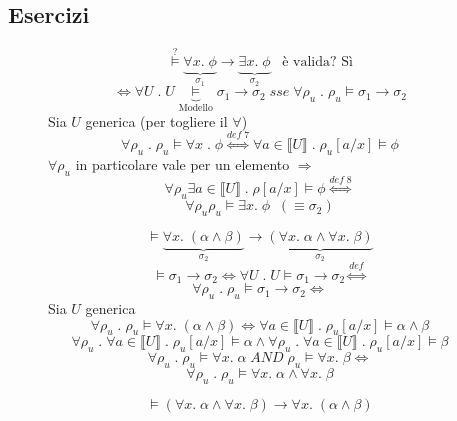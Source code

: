 \documentclass{article}
\theoremstyle{break}
\theoremstyle{break}
\theoremstyle{break}
\theoremstyle{break}
\begin{document}
  \subsection{Esercizi}
  \begin{figure}[H]
    \begin{exercise}
      \[
        \stackrel{?}{\models} \underbrace{\forall x.\; \phi}_{\sigma_1} \to \underbrace{\exists x.\; \phi}_{\sigma_2} \;\;\; \text{è valida? Sì}
      \] 
      \[
        \Leftrightarrow \forall U\;.\; U \underbrace{\models}_{\text{Modello}} \sigma_1 \to \sigma_2 \;sse\; \forall \rho_u \;.\; \rho_u \models \sigma_1 \to \sigma_2
      \] 
      Sia \( U \) generica (per togliere il \( \forall  \))
      \[
        \forall \rho_u\;.\; \rho_u \models \forall x\;.\;\phi \stackrel{def\;7}{\Leftrightarrow} \forall a \in \llbracket U\rrbracket \;.\; \rho_u[a/x] \models \phi
      \] 
      \( \forall \rho_u \) in particolare vale per un elemento \( \Rightarrow \) \[\forall \rho_u \exists a \in \llbracket U\rrbracket\;.\;\rho[a/x] \models \phi \stackrel{def\;8}{\Leftrightarrow}\] 
      \[
        \forall \rho_u \rho_u \models \exists x.\; \phi\;\;(\equiv \sigma_2)
      \] 
    \end{exercise}
  \end{figure}
  \begin{figure}[H]
    \begin{exercise}
      \[
        \models \underbrace{\forall x. \; (\alpha \wedge \beta)}_{\sigma_2} \to \underbrace{(\forall x.\;\alpha \wedge \forall x.\; \beta)}_{\sigma_2}
      \] 
      \[
        \models \sigma_1 \to \sigma_2 \Leftrightarrow \forall U \;.\; U \models \sigma_1 \to \sigma_2 \stackrel{def}{\Leftrightarrow}
      \] 
      \[
        \forall \rho_u \;.\; \rho_u \models \sigma_1 \to \sigma_2 \Leftrightarrow
      \] 
      Sia \( U \) generica
      \[
        \forall \rho_u\;.\; \rho_u \models \forall x.\; (\alpha \wedge \beta) \Leftrightarrow \forall a \in \llbracket U\rrbracket\;.\; \rho_u[a/x] \models \alpha \wedge \beta
      \] 
      \[
        \forall \rho_u \;.\; \forall a \in \llbracket U\rrbracket\;.\; \rho_u[a/x] \models \alpha \wedge \forall \rho_u \;.\; \forall a \in \llbracket U\rrbracket\;.\; \rho_u[a/x] \models \beta
      \] 
      \[
        \forall \rho_u\;.\; \rho_u \models \forall x.\;\alpha \;AND\;\rho_u \models \forall x.\; \beta \Leftrightarrow
      \] 
      \[
        \forall \rho_u\;.\; \rho_u \models \forall x.\;\alpha \wedge \forall x.\; \beta
      \] 
    \end{exercise}
  \end{figure}
  \begin{figure}[H]
    \begin{exercise}[a casa]
      \[
        \models (\forall x.\;\alpha \wedge \forall x.\; \beta) \to \forall x. \; (\alpha \wedge \beta)
      \] 
    \end{exercise}
  \end{figure}
\end{document}
